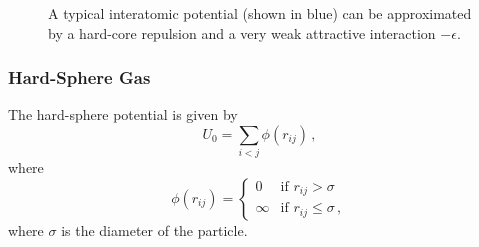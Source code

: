\documentclass{article}
\theoremstyle{plain}\theoremheaderfont{\normalfont\bfseries}\theorembodyfont{\rmfamily}\theoremseparator{.}\newtheorem*{thm}{Theorem}\newtheorem*{law}{Law}\newtheorem*{pos}{Postulate}
\numberwithin{equation}{section}
\begin{document}
    \begin{figure}
        \centering
        \caption{A typical interatomic potential (shown in blue) can be approximated by a hard-core repulsion and a very weak attractive interaction \(-\epsilon\).}
    \end{figure}

    \subsubsection{Hard-Sphere Gas}
    The hard-sphere potential is given by
    \begin{equation}
        U_0=\sum_{i<j}\phi(r_{ij})\,,
    \end{equation}
    where
    \begin{equation}
        \phi(r_{ij})=\begin{cases}
            0 & \text{if }r_{ij}>\sigma\\
            \infty & \text{if }r_{ij}\le\sigma\,,
        \end{cases}
    \end{equation}
    where \(\sigma\) is the diameter of the particle.
\end{document}
